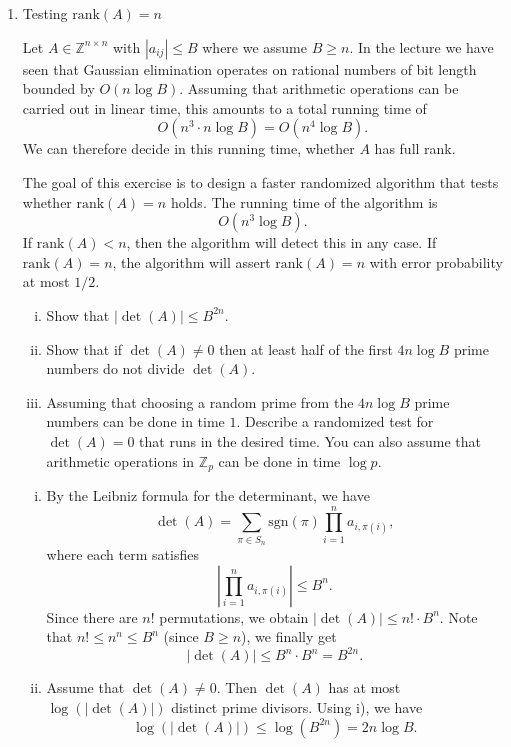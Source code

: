 \documentclass[11pt]{article}
\newcommand{\rank}{\mathrm{rank}}
\begin{document}
\begin{enumerate}[1)]
\item {Testing ${\rank(A) = n}$}

\smallskip
\noindent 
Let $A ∈ ℤ^{n ×n}$ with $|a_{ij}| ≤ B$ where we assume $B ≥n$. In the lecture we have seen that Gaussian elimination operates on rational numbers of bit length bounded by $O(n \log B)$. Assuming that arithmetic operations can be carried out in linear time, this amounts to a total running time of
\begin{displaymath}
  O(n ^3 ⋅n  \log B) =  O(n ^4  \log B). 
\end{displaymath}
We can therefore decide in this running time, whether $A$ has full rank. 

The goal of this exercise is to design a faster randomized algorithm that tests whether $\rank(A) =n$ holds. The running time of the algorithm is
\begin{displaymath}
    O(n ^3  \log B). 
\end{displaymath}
If $\rank(A) <n$, then the algorithm will detect this in any case.
If $\rank(A) =n$, the algorithm will assert $\rank(A) = n$ with error probability at most $1/2$.  

\begin{enumerate}[i)]
\item Show that $|\det(A)| ≤ B^{2n}$.
\item Show that if $\det(A) ≠0$ then at least half of the first $4n\log B$ prime numbers do not divide $\det(A)$.
\item Assuming that choosing a random prime from the $4n\log B$ prime numbers can be done in time $1$.
Describe a randomized test for $\det(A) =0$ that runs in the desired time. You can also assume that arithmetic operations in $ℤ_p$ can be done in time $\log p$. 
\end{enumerate}

\begin{solution}
\begin{enumerate}[i)]

\item 
By the Leibniz formula for the determinant, we have
\[
\det(A) = \sum_{\pi \in S_n} \mathrm{sgn}(\pi)\prod_{i=1}^n a_{i,\pi(i)},
\]
where each term satisfies
\[
\left|\prod_{i=1}^n a_{i,\pi(i)}\right| \le B^n.
\]
Since there are $n!$ permutations, we obtain $|\det(A)| \le n! \cdot B^n$.
Note that $n! \le n^n \le B^n$ (since $B \ge n$), we finally get
\[
|\det(A)| \le B^n \cdot B^n = B^{2n}.
\]

\item 
Assume that $\det(A) \neq 0$. Then $\det(A)$ has at most $\log (|\det(A)|)$ distinct prime divisors. Using i), we have
\[
\log(|\det(A)|) \le \log (B^{2n}) = 2n \log B.
\]


\end{enumerate}
\end{solution}
\end{enumerate}
\end{document}
